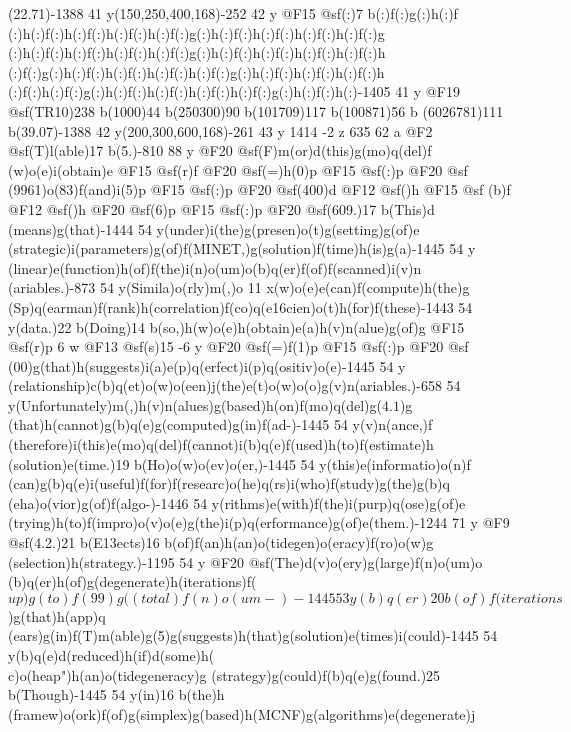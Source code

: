 {{{{{{{{{{{{{{{{{{{{{{{{{{{{{{{{{{{{{{{{{{{{{{{{{{{{{{{{{{{{{{{{{{{{{(22.71)-1388 41 y(150,250,400,168)-252 42 y @F15 @sf(:)7 b(:)f(:)g(:)h(:)f
(:)h(:)f(:)h(:)f(:)h(:)f(:)h(:)f(:)g(:)h(:)f(:)h(:)f(:)h(:)f(:)h(:)f(:)g
(:)h(:)f(:)h(:)f(:)h(:)f(:)h(:)f(:)g(:)h(:)f(:)h(:)f(:)h(:)f(:)h(:)f(:)h
(:)f(:)g(:)h(:)f(:)h(:)f(:)h(:)f(:)h(:)f(:)g(:)h(:)f(:)h(:)f(:)h(:)f(:)h
(:)f(:)h(:)f(:)g(:)h(:)f(:)h(:)f(:)h(:)f(:)h(:)f(:)g(:)h(:)f(:)h(:)-1405 
41 y @F19 @sf(TR10)238 b(1000)44 b(250300)90 b(101709)117 b(100871)56 b
(6026781)111 b(39.07)-1388 42 y(200,300,600,168)-261 43 y 1414 -2 z 635 
62 a @F2 @sf(T)l(able)17 b(5.)-810 88 y @F20 @sf(F)m(or)d(this)g(mo)q(del)f
(w)o(e)i(obtain)e @F15 @sf(r)f @F20 @sf(=)h(0)p @F15 @sf(:)p @F20 @sf
(9961)o(83)f(and)i(5)p @F15 @sf(:)p @F20 @sf(400)d @F12 @sf()h @F15 @sf
(b)f @F12 @sf()h @F20 @sf(6)p @F15 @sf(:)p @F20 @sf(609.)17 b(This)d
(means)g(that)-1444 54 y(under)i(the)g(presen)o(t)g(setting)g(of)e
(strategic)i(parameters)g(of)f(MINET,)g(solution)f(time)h(is)g(a)-1445 54 y
(linear)e(function)h(of)f(the)i(n)o(um)o(b)q(er)f(of)f(scanned)i(v)n
(ariables.)-873 54 y(Simila)o(rly)m(,)o 11 x(w)o(e)e(can)f(compute)h(the)g
(Sp)q(earman)f(rank)h(correlation)f(co)q(e\016cien)o(t)h(for)f(these)-1443 
54 y(data.)22 b(Doing)14 b(so,)h(w)o(e)h(obtain)e(a)h(v)n(alue)g(of)g 
@F15 @sf(r)p 6 w @F13 @sf(s)15 -6 y @F20 @sf(=)f(1)p @F15 @sf(:)p @F20 @sf
(00)g(that)h(suggests)i(a)e(p)q(erfect)i(p)q(ositiv)o(e)-1445 54 y
(relationship)c(b)q(et)o(w)o(een)j(the)e(t)o(w)o(o)g(v)n(ariables.)-658 
54 y(Unfortunately)m(,)h(v)n(alues)g(based)h(on)f(mo)q(del)g(\(4.1\))g
(that)h(cannot)g(b)q(e)g(computed)g(in)f(ad-)-1445 54 y(v)n(ance,)f
(therefore)i(this)e(mo)q(del)f(cannot)i(b)q(e)f(used)h(to)f(estimate)h
(solution)e(time.)19 b(Ho)o(w)o(ev)o(er,)-1445 54 y(this)e(informatio)o(n)f
(can)g(b)q(e)i(useful)f(for)f(researc)o(he)q(rs)i(who)f(study)g(the)g(b)q
(eha)o(vior)g(of)f(algo-)-1446 54 y(rithms)e(with)f(the)i(purp)q(ose)g(of)e
(trying)h(to)f(impro)o(v)o(e)g(the)i(p)q(erformance)g(of)e(them.)-1244 71 y 
@F9 @sf(4.2.)21 b(E\013ects)16 b(of)f(an)h(an)o(ti{degen)o(eracy)f(ro)o(w)g
(selection)h(strategy.)-1195 54 y @F20 @sf(The)d(v)o(ery)g(large)f(n)o(um)o
(b)q(er)h(of)g(degenerate)h(iterations)f(\(up)g(to)f(99)g(%
(total)f(n)o(um-)-1445 53 y(b)q(er)20 b(of)f(iterations\))g(that)h(app)q
(ears)g(in)f(T)m(able)g(5)g(suggests)h(that)g(solution)e(times)i(could)-1445 
54 y(b)q(e)d(reduced)h(if)d(some)h(\\c)o(heap")h(an)o(ti{degeneracy)g
(strategy)g(could)f(b)q(e)g(found.)25 b(Though)-1445 54 y(in)16 b(the)h
(framew)o(ork)f(of)g(simplex)g(based)h(MCNF)g(algorithms)e(degenerate)j
}}}}}}}}}}}}}}}}}}}}}}}}}}}}}}}}}}}}}}}}}}}}}}}}}}}}}}}}}}}}}}}}}}}}}}}
